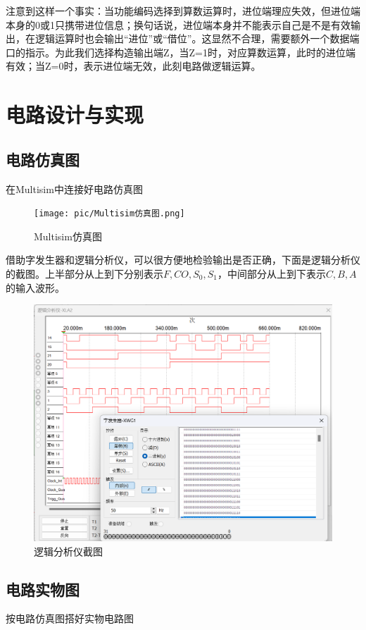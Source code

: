\documentclass{ctexart}
\begin{document}
注意到这样一个事实：当功能编码选择到算数运算时，进位端理应失效，但进位端本身的0或1只携带进位信息；换句话说，进位端本身并不能表示自己是不是有效输出，在逻辑运算时也会输出“进位”或“借位”。这显然不合理，需要额外一个数据端口的指示。为此我们选择构造输出端Z，当Z=1时，对应算数运算，此时的进位端有效；当Z=0时，表示进位端无效，此刻电路做逻辑运算。
\section{电路设计与实现}
\subsection{电路仿真图}
在Multisim中连接好电路仿真图
\begin{figure}[H]
    \centering
    \texttt{[image: pic/Multisim仿真图.png]}
    \caption{Multisim仿真图}
    \label{fig:enter-label}
\end{figure}
借助字发生器和逻辑分析仪，可以很方便地检验输出是否正确，下面是逻辑分析仪的截图。上半部分从上到下分别表示$F,CO,S_0,S_1$，中间部分从上到下表示$C,B,A$的输入波形。
\begin{figure}[H]
    \centering
    \includegraphics[width=0.75\linewidth]{pic/image.png}
    \caption{逻辑分析仪截图}
    \label{fig:enter-label}
\end{figure}
\subsection{电路实物图}
按电路仿真图搭好实物电路图
\end{document}
